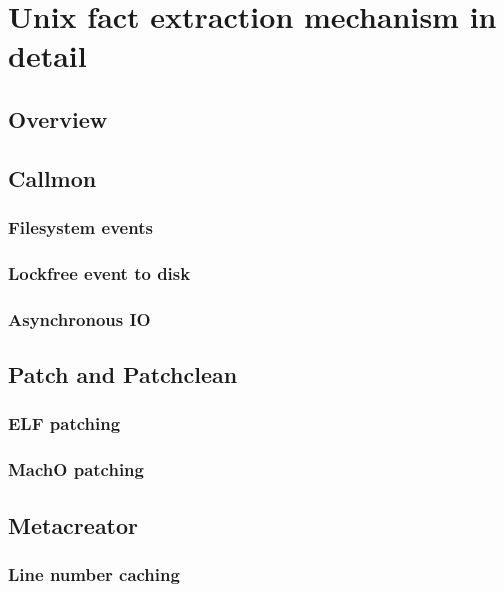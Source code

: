 \section{Unix fact extraction mechanism in detail}

\subsection{Overview}

\subsection{Callmon} 

\subsubsection{Filesystem events} 

\subsubsection{Lockfree event to disk} 

\subsubsection{Asynchronous IO}

\subsection{Patch and Patchclean} 

\subsubsection{ELF patching} 

\subsubsection{MachO patching}

\subsection{Metacreator} 

\subsubsection{Line number caching} 
